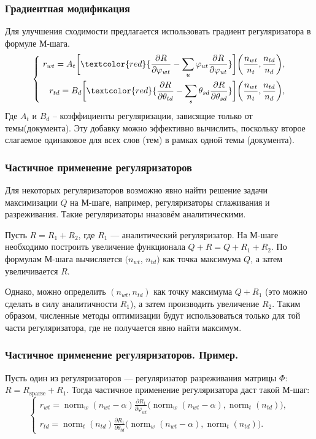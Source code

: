 \documentclass[utf8]{beamer}
\DeclareMathOperator{\norm}{norm}
\renewcommand{\phi}{\varphi}
\begin{document}
	
\begin{frame}
\frametitle{Градиентная модификация}
Для улучшения сходимости предлагается использовать градиент регуляризатора в формуле М-шага.
\[
\left\{\
	\begin{aligned}
		r_{wt} =  A_t \bigg[\textcolor{red} {\frac{\partial{R}}{\partial{\phi_{wt}}} - \sum\limits_u \phi_{ut} \frac{\partial{R}}{\partial{\phi_{ut}}} }\bigg] \bigg(\frac{n_{wt}}{n_t}, \frac{n_{td}}{n_d}\bigg),\\
		r_{td} =  B_d \bigg[ \textcolor{red} {\frac{\partial{R}}{\partial{\theta_{td}}} - \sum\limits_s \theta_{sd} \frac{\partial{R}}{\partial{\theta_{sd}}} }\bigg] \bigg(\frac{n_{wt}}{n_t}, \frac{n_{td}}{n_d}\bigg),
	\end{aligned}
\right.
\]
Где $A_t$ и $B_d$ -- коэффициенты регуляризации, зависящие только от темы(документа). Эту добавку можно эффективно вычислить, поскольку второе слагаемое одинаковое для всех слов (тем) в рамках одной темы (документа).
\end{frame}


\begin{frame}
\frametitle{Частичное применение регуляризаторов}
Для некоторых регуляризаторов возможно явно найти решение  задачи  максимизации  $Q$ на М-шаге, например, регуляризаторы сглаживания и разреживания. Такие регуляризаторы нназовём аналитическими.
\medskip

Пусть $R = R_1 + R_2$, где $R_1$ --- аналитический регуляризатор. На М-шаге необходимо построить увеличение функционала $Q + R = Q + R_1 + R_2$. По формулам М-шага вычисляется $(n_{wt}$, $n_{td})$ как точка максимума $Q$, а затем увеличивается $R$.  
\medskip

Однако, можно определить $(n_{wt},n_{td})$ как точку максимума $Q + R_1 $ (это можно сделать в силу аналитичности $R_1$), а затем производить увеличение $R_2$. Таким образом,  численные методы оптимизации будут использоваться только для той части регуляризатора, где не получается явно найти максимум.
\end{frame}

\begin{frame}
\frametitle{Частичное применение регуляризаторов. Пример.}
Пусть один из регуляризаторов --- регуляризатор разреживания матрицы $\Phi$: $R = R_{\text{sparse}} + R_1$. Тогда частичное применение регуляризатора даст такой М-шаг:
\[
\left\{
	\begin{aligned}
		r_{wt} = \norm_w(n_{wt} - \alpha) \frac{\partial{R_1}}{\partial{\phi_{wt}}} \bigg( \norm_w(n_{wt} - \alpha),\norm_t(n_{td})\bigg),\\
		r_{td} = \norm_t(n_{td}) \frac{\partial{R_1}}{\partial{\theta_{td}}} \bigg(\norm_w(n_{wt} - \alpha), \norm_t(n_{td})\bigg).
	\end{aligned}
\right.
\]
\end{frame}
\end{document}
